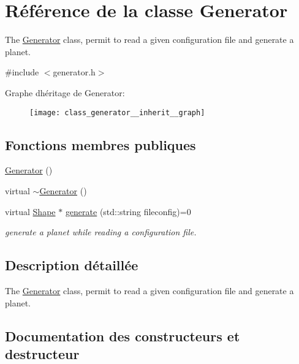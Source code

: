 \hypertarget{class_generator}{}\section{Référence de la classe Generator}
\label{class_generator}


The \hyperlink{class_generator}{Generator} class, permit to read a given configuration file and generate a planet.  




{\ttfamily \#include $<$generator.\+h$>$}



Graphe d\textquotesingle{}héritage de Generator\+:\nopagebreak
\begin{figure}[H]
\begin{center}
\leavevmode
\texttt{[image: class\_generator\_\_inherit\_\_graph]}
\end{center}
\end{figure}
\subsection*{Fonctions membres publiques}
\begin{DoxyCompactItemize}
\item 
\hyperlink{class_generator_aaaf1e5f3a47ede3ef8a96a301ee04a10}{Generator} ()
\item 
virtual \hyperlink{class_generator_aeb355d65ed59bc5738a5b3e9637186e1}{$\sim$\+Generator} ()
\item 
virtual \hyperlink{class_shape}{Shape} $\ast$ \hyperlink{class_generator_a91197ce0544ad549cf3646957c33c0e9}{generate} (std\+::string fileconfig)=0
\begin{DoxyCompactList}\small\item\em generate a planet while reading a configuration file. \end{DoxyCompactList}\end{DoxyCompactItemize}


\subsection{Description détaillée}
The \hyperlink{class_generator}{Generator} class, permit to read a given configuration file and generate a planet. 

\subsection{Documentation des constructeurs et destructeur}
\mbox{\label{class_generator_aaaf1e5f3a47ede3ef8a96a301ee04a10}} 
